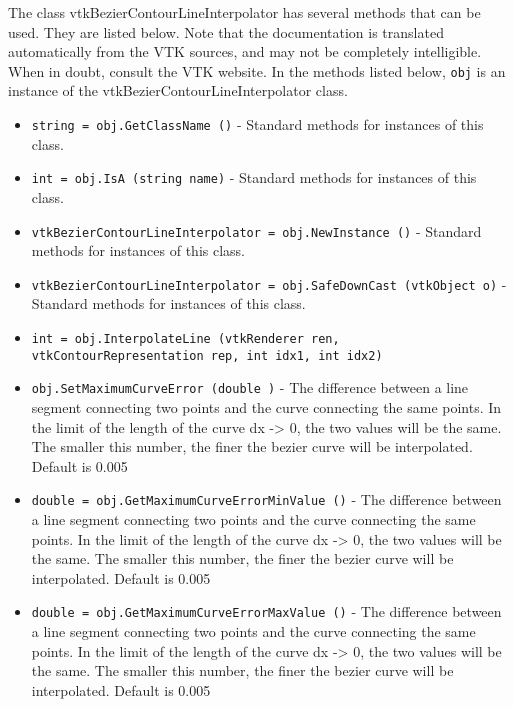 The class vtkBezierContourLineInterpolator has several methods that can be used.
  They are listed below.
Note that the documentation is translated automatically from the VTK sources,
and may not be completely intelligible.  When in doubt, consult the VTK website.
In the methods listed below, \verb|obj| is an instance of the vtkBezierContourLineInterpolator class.
\begin{itemize}
\item  \verb|string = obj.GetClassName ()| -  Standard methods for instances of this class.

\item  \verb|int = obj.IsA (string name)| -  Standard methods for instances of this class.

\item  \verb|vtkBezierContourLineInterpolator = obj.NewInstance ()| -  Standard methods for instances of this class.

\item  \verb|vtkBezierContourLineInterpolator = obj.SafeDownCast (vtkObject o)| -  Standard methods for instances of this class.

\item  \verb|int = obj.InterpolateLine (vtkRenderer ren, vtkContourRepresentation rep, int idx1, int idx2)|

\item  \verb|obj.SetMaximumCurveError (double )| -  The difference between a line segment connecting two points and the curve
 connecting the same points. In the limit of the length of the curve 
 dx -> 0, the two values will be the same. The smaller this number, the 
 finer the bezier curve will be interpolated. Default is 0.005

\item  \verb|double = obj.GetMaximumCurveErrorMinValue ()| -  The difference between a line segment connecting two points and the curve
 connecting the same points. In the limit of the length of the curve 
 dx -> 0, the two values will be the same. The smaller this number, the 
 finer the bezier curve will be interpolated. Default is 0.005

\item  \verb|double = obj.GetMaximumCurveErrorMaxValue ()| -  The difference between a line segment connecting two points and the curve
 connecting the same points. In the limit of the length of the curve 
 dx -> 0, the two values will be the same. The smaller this number, the 
 finer the bezier curve will be interpolated. Default is 0.005


\end{itemize}
